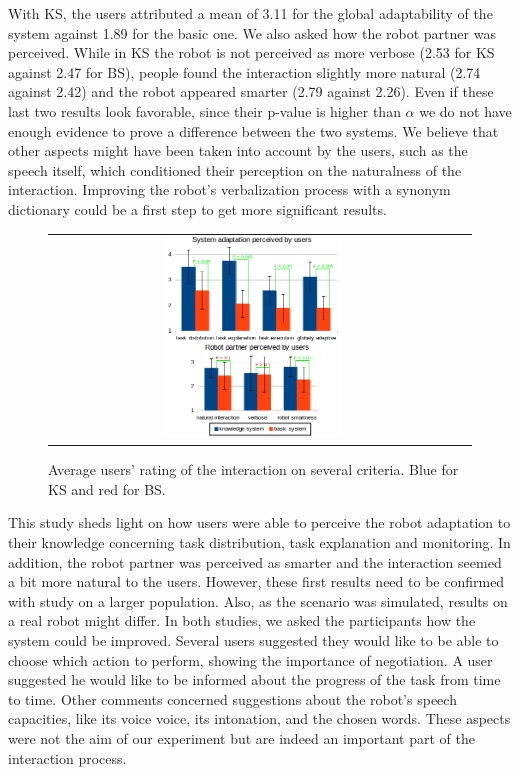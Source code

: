 With KS, the users attributed a mean of 3.11 for the global adaptability of the system against 1.89 for the basic one.
We also asked how the robot partner was perceived. While in KS the robot is not perceived as more verbose (2.53 for KS against 2.47 for BS), people found the interaction slightly more natural (2.74 against 2.42) and the robot appeared smarter (2.79 against 2.26). Even if these last two results look favorable, since their p-value is higher than $\alpha$  we do not have enough evidence to prove a difference between the two systems. We believe that other aspects might have been taken into account by the users, such as the speech itself, which conditioned their perception on the naturalness of the interaction. Improving the robot's verbalization process with a synonym dictionary could be a first step to get more significant results.



 \begin{figure}[ht!]
 \centering
 \begin{tabular}{cc}
  \includegraphics[width=0.45\textwidth]{img/teacher/respvalue3.png}
 \end{tabular}
 \caption[Average users' rating of the interaction on several criteria]{Average users' rating of the interaction on several criteria. Blue for KS and red for BS.}
 \label{fig:teacher_results-results}
 \end{figure}

This study sheds light on how users were able to perceive the robot adaptation to their knowledge concerning task distribution, task explanation and monitoring. In addition, the robot partner was perceived as smarter and the interaction seemed a bit more natural to the users. However, these first results need to be confirmed with study on a larger population. Also, as the scenario was simulated, results on a real robot might differ.
In both studies, we asked the participants how the system could be improved. Several users suggested they would like to be able to choose which action to perform, showing the importance of negotiation. A user suggested he would like to be informed about the progress of the task from time to time. Other comments concerned suggestions about the robot's speech capacities, like its voice voice, its intonation, and the chosen words. These aspects were not the aim of our  experiment but are indeed an important part of the interaction process. 
